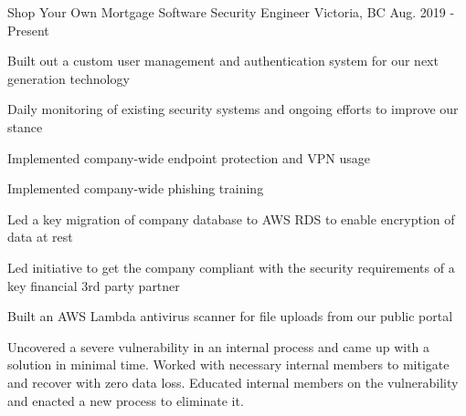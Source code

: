 


\begin{cventries}


\cventry
{Shop Your Own Mortgage} %
{Software Security Engineer} %
{Victoria, BC} %
{Aug. 2019 - Present} %
{ %
\begin{cvitems}
\item {Built out a custom user management and authentication system for our next generation technology}
\item {Daily monitoring of existing security systems and ongoing efforts to improve our stance}
\item {Implemented company-wide endpoint protection and VPN usage}
\item {Implemented company-wide phishing training}
\item {Led a key migration of company database to AWS RDS to enable encryption of data at rest}
\item {Led initiative to get the company compliant with the security requirements of a key financial 3rd party partner}
\item {Built an AWS Lambda antivirus scanner for file uploads from our public portal}
\item {Uncovered a severe vulnerability in an internal process and came up with a solution in minimal time. Worked with necessary internal members to mitigate and recover with zero data loss. Educated internal members on the vulnerability and enacted a new process to eliminate it. }
\end{cvitems}
}



\end{cventries}
